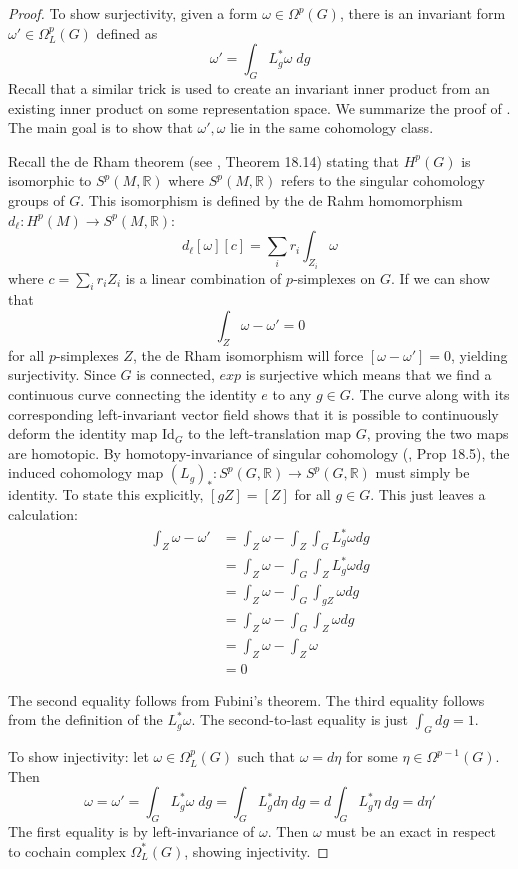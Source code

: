 \documentclass[12pt]{amsart}
\numberwithin{equation}{section}
\begin{document}
\begin{proof}
  To show surjectivity, given a form $\omega \in \Omega^p(G)$, there is an invariant form $\omega' \in \Omega^p_L(G)$ defined as
  \begin{equation}
    \omega' = \int_G L^*_g\omega \; dg
  \end{equation}
  Recall that a similar trick is used to create an invariant inner product from an existing inner product on some representation space. We summarize the proof of \cite{chevalley}. The main goal is to show that $\omega',\omega$ lie in the same cohomology class.

  Recall the de Rham theorem (see \cite{lee}, Theorem 18.14) stating that $H^p(G)$ is isomorphic to $S^p(M,\mathbb{R})$ where $S^p(M, \mathbb{R})$ refers to the singular cohomology groups of $G$. This isomorphism is defined by the de Rahm homomorphism $d_{\ell}: H^p(M) \rightarrow S^p(M,\mathbb{R})$:
  $$ d_\ell[\omega][c] = \sum_{i}r_i\int_{Z_i} \omega $$
  where $c = \sum_{i}r_iZ_i$ is a linear combination of $p$-simplexes on $G$. If we can show that
  $$ \int_Z \omega - \omega' = 0 $$ for all $p$-simplexes $Z$, the de Rham isomorphism will force $[\omega - \omega'] = 0$, yielding surjectivity. Since $G$ is connected, $exp$ is surjective which means that we find a continuous curve connecting the identity $e$ to any $g \in G$. The curve along with its corresponding left-invariant vector field shows that it is possible to continuously deform the identity map Id$_G$ to the left-translation map $G$, proving the two maps are homotopic. By homotopy-invariance of singular cohomology (\cite{lee}, Prop 18.5), the induced cohomology map $(L_g)_*: S^p(G, \mathbb{R}) \rightarrow S^p(G, \mathbb{R})$ must simply be identity. To state this explicitly, $[gZ] = [Z]$ for all $g \in G$. This just leaves a calculation:
  \begin{align*}
    \int_Z \omega - \omega'
    & = \int_Z \omega - \int_Z\int_G L^*_{g}\omega dg \\
    & = \int_Z \omega - \int_G\int_Z L^*_{g}\omega dg \\
    & = \int_Z \omega - \int_G\int_{gZ} \omega dg \\
    & = \int_Z \omega - \int_G\int_{Z} \omega dg \\
    & = \int_Z \omega - \int_{Z} \omega  \\
    &= 0
  \end{align*}

  The second equality follows from Fubini's theorem. The third equality follows from the definition of the $L_{g}^*\omega$. The second-to-last equality is just $\int_G dg = 1$. \newline

  To show injectivity: let $\omega \in \Omega_L^p(G)$ such that $\omega = d\eta$ for some $\eta \in \Omega^{p-1}(G)$. Then
  $$\omega = \omega' = \int_G L^*_g\omega \; dg = \int_G L^*_g d\eta \; dg = d \int_G L^*_g \eta \; dg = d\eta' $$
  The first equality is by left-invariance of $\omega$. Then $\omega$ must be an exact in respect to cochain complex $\Omega^*_L(G)$, showing injectivity.
\end{proof}
\end{document}
